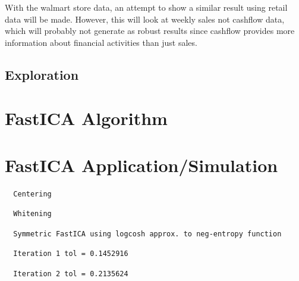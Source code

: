 \documentclass[12pt,twoside]{amherstthesis}
\begin{document}
  With the walmart store data, an attempt to show a similar result using
  retail data will be made. However, this will look at weekly sales not
  cashflow data, which will probably not generate as robust results since
  cashflow provides more information about financial activities than just
  sales.
  
  \subsection{Exploration}\label{exploration}
  
  \section{FastICA Algorithm}\label{fastica-algorithm}
  
  \section{FastICA
  Application/Simulation}\label{fastica-applicationsimulation}
  
  \begin{Shaded}
  \begin{Highlighting}[]
  \NormalTok{, }\NormalTok{,} \NormalTok{,,}\NormalTok{,}\NormalTok{,} \NormalTok{,}\NormalTok{)}
  \end{Highlighting}
  \end{Shaded}
  
  \begin{verbatim}
  Centering
  \end{verbatim}
  
  \begin{verbatim}
  Whitening
  \end{verbatim}
  
  \begin{verbatim}
  Symmetric FastICA using logcosh approx. to neg-entropy function
  \end{verbatim}
  
  \begin{verbatim}
  Iteration 1 tol = 0.1452916
  \end{verbatim}
  
  \begin{verbatim}
  Iteration 2 tol = 0.2135624
  \end{verbatim}
  
\end{document}
